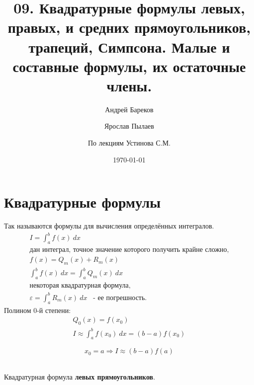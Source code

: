 \documentclass[a4paper,11pt]{article}
\title{09. Квадратурные формулы левых, правых, и средних прямоугольников, трапеций, Симпсона. Малые и составные формулы, их остаточные члены.}
\author{Андрей Бареков \and Ярослав Пылаев \and По лекциям Устинова С.М.}
\date{\today}
\begin{document}
\maketitle
\newpage

\section{Квадратурные формулы}
Так называются формулы для вычисления определённых интегралов.
\begin{gather*}
  I = \int_a^b f(x)\ dx \\
  \text{дан интеграл, точное значение которого получить крайне сложно,} \\
  f(x) = Q_m(x) + R_m(x) \\
  \int_a^b f(x)\ dx = \int_a^b Q_m(x)\ dx \\
  \text{некоторая квадратурная формула,} \\
  \varepsilon = \int_a^b R_m(x)\ dx \hspace{10pt} \text{- ее погрешность.}
\end{gather*}
Полином 0-й степени:
\begin{gather*}
  Q_0(x) = f(x_0) \\
  I \approx \int_a^b f(x_0)\ dx = (b - a)f(x_0)
\end{gather*}
\begin{tcolorbox}
  \begin{equation}
    x_0 = a \Rightarrow I \approx (b - a)f(a)
    \label{eq:QRLR}
  \end{equation}
  \begin{center}
     \\
    Квадратурная формула \textbf{левых прямоугольников}.
  \end{center}
\end{tcolorbox}
\end{document}
